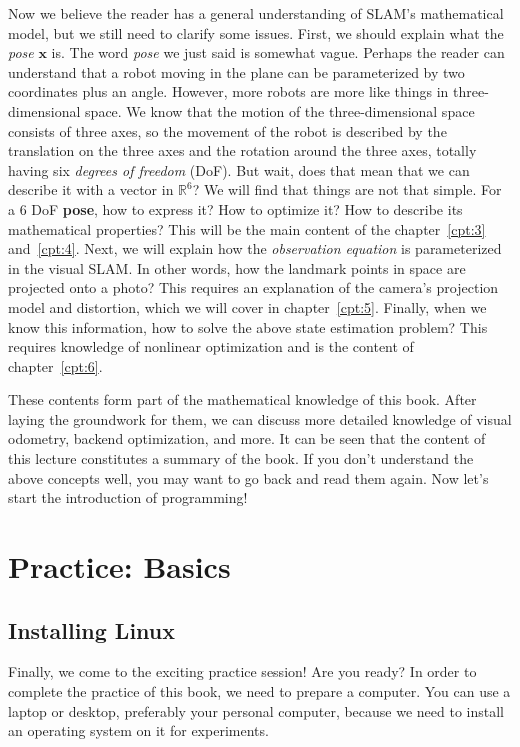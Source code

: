 Now we believe the reader has a general understanding of SLAM's mathematical model, but we still need to clarify some issues. First, we should explain what the \textit{pose} $\mathbf{x}$ is. The word \textit{pose} we just said is somewhat vague. Perhaps the reader can understand that a robot moving in the plane can be parameterized by two coordinates plus an angle. However, more robots are more like things in three-dimensional space. We know that the motion of the three-dimensional space consists of three axes, so the movement of the robot is described by the translation on the three axes and the rotation around the three axes, totally having six \textit{degrees of freedom} (DoF). But wait, does that mean that we can describe it with a vector in $\mathbb{R}^6$? We will find that things are not that simple. For a 6 DoF \textbf{pose}, how to express it? How to optimize it? How to describe its mathematical properties?  This will be the main content of the chapter~\ref{cpt:3} and~\ref{cpt:4}. Next, we will explain how the \textit{observation equation} is parameterized in the visual SLAM. In other words, how the landmark points in space are projected onto a photo? This requires an explanation of the camera's projection model and distortion, which we will cover in chapter~\ref{cpt:5}. Finally, when we know this information, how to solve the above state estimation problem? This requires knowledge of nonlinear optimization and is the content of chapter~\ref{cpt:6}.
    
These contents form part of the mathematical knowledge of this book. After laying the groundwork for them, we can discuss more detailed knowledge of visual odometry, backend optimization, and more. It can be seen that the content of this lecture constitutes a summary of the book. If you don't understand the above concepts well, you may want to go back and read them again. Now let's start the introduction of programming!

\section{Practice: Basics}
\subsection{Installing Linux}
Finally, we come to the exciting practice session! Are you ready? In order to complete the practice of this book, we need to prepare a computer. You can use a laptop or desktop, preferably your personal computer, because we need to install an operating system on it for experiments.

